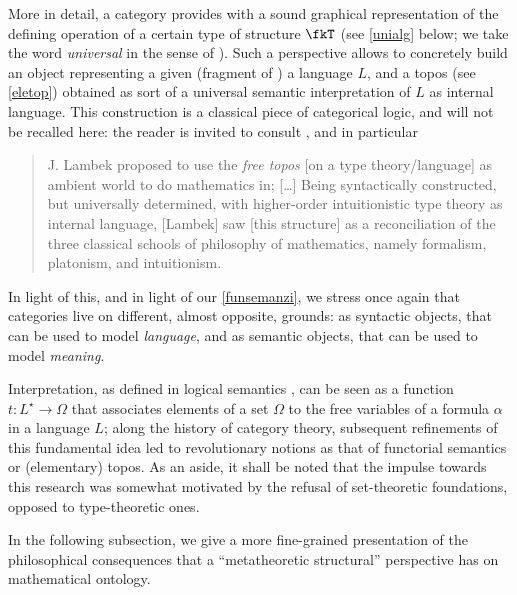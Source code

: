 More in detail, a category provides with a sound graphical representation of the defining operation of a certain type of structure $\fkT$ (see \autoref{unialg} below; we take the word \emph{universal} in the sense of \cite{Kurosh:o:altri}).
Such a perspective allows to concretely build an object representing a given (fragment of ) a language $L$, and a topos (see \autoref{eletop}) obtained as sort of a universal semantic interpretation of $L$ as internal language. This construction is a classical piece of categorical logic, and will not be recalled here: the reader is invited to consult \cite[II.12, 13, 14]{lambek1988introduction}, and in particular
\begin{quote}
	J. Lambek proposed to use the \emph{free topos} [on a type theory/language] as ambient world to do mathematics in; [\dots\unkern] Being syntactically constructed, but universally determined, with higher-order intuitionistic type theory as internal language, [Lambek] saw [this structure] as a reconciliation of the three classical schools of philosophy of mathematics, namely formalism, platonism, and intuitionism.
\end{quote}
In light of this, and in light of our \autoref{funsemanzi}, we stress once again that categories live on different, almost opposite, grounds: as syntactic objects, that can be used to model \emph{language}, and as semantic objects, that can be used to model \emph{meaning}.

Interpretation, as defined in logical semantics \cite{gamut1991logic}, can be seen as a function $t: L^\star \to \Omega$ that associates elements of a set $\Omega$ to the free variables of a formula $\alpha$ in a language $L$; along the history of category theory, subsequent refinements of this fundamental idea led to revolutionary notions as that of functorial semantics or (elementary) topos.
As an aside, it shall be noted that the impulse towards this research was somewhat motivated by the refusal of set-theoretic foundations, opposed to type-theoretic ones.

In the following subsection, we give a more fine-grained presentation of the philosophical consequences that a ``metatheoretic structural'' perspective has on mathematical ontology.
